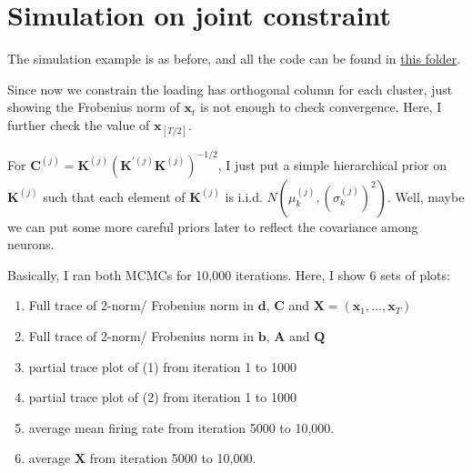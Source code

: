 \documentclass[]{article}
\begin{document}
\section{Simulation on joint constraint}
The simulation example is as before, and all the code can be found in \href{https://github.com/weigcdsb/state-space-clustering/tree/main/LDS/blkDiag}{this folder}.

Since now we constrain the loading has orthogonal column for each cluster, just showing the Frobenius norm of $\mathbf{x}_t$ is not enough to check convergence. Here, I further check the value of $\mathbf{x}_{[T/2]}$.

For \(\mathbf{C}^{(j)} = \mathbf{K}^{(j)}\left( \mathbf{K}^{'(j)}\mathbf{K}^{(j)} \right)^{- 1/2}\), I just put a simple hierarchical prior on $\mathbf{K}^{(j)}$ such that each element of $\mathbf{K}^{(j)}$ is i.i.d. $N(\mu_{k}^{(j)}, (\sigma^{(j)}_{k})^2)$. Well, maybe we can put some more careful priors later to reflect the covariance among neurons.

Basically, I ran both MCMCs for 10,000 iterations. Here, I show 6 sets of plots:
\begin{enumerate}
	\def\labelenumi{(\arabic{enumi})}
	\item
	Full trace of  2-norm/ Frobenius norm in $\bm{d}$, $\bm{C}$ and $\mathbf{X} = (\mathbf{x}_{1},\ldots,\mathbf{x}_{T})$
	\item
	Full trace of 2-norm/ Frobenius norm in $\mathbf{b}$, $\mathbf{A}$ and $\mathbf{Q}$ 
	\item
	partial trace plot of (1) from iteration 1 to 1000
	\item
	partial trace plot of (2) from iteration 1 to 1000
	\item
	average mean firing rate from iteration 5000 to 10,000.
	\item
	average $\mathbf{X}$ from iteration 5000 to 10,000.
\end{enumerate}
\end{document}
